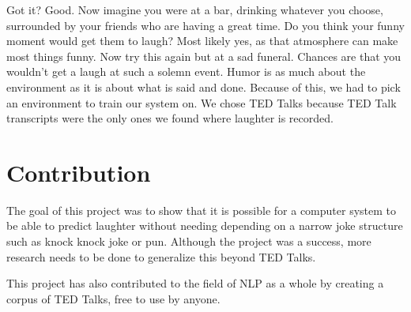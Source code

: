Got it? Good. Now imagine you were at a bar, drinking whatever you choose, surrounded by your friends who are having a great time. Do you think your funny moment would get them to laugh? Most likely yes, as that atmosphere can make most things funny. Now try this again but at a sad funeral. Chances are that you wouldn't get a laugh at such a solemn event. Humor is as much about the environment as it is about what is said and done. Because of this, we had to pick an environment to train our system on. We chose TED Talks because TED Talk transcripts were the only ones we found where laughter is recorded. 

\section{Contribution}
The goal of this project was to show that it is possible for a computer system to be able to predict laughter without needing depending on a narrow joke structure such as knock knock joke or pun. Although the project was a success, more research needs to be done to generalize this beyond TED Talks. 

This project has also contributed to the field of NLP as a whole by creating a corpus of TED Talks, free to use by anyone.
